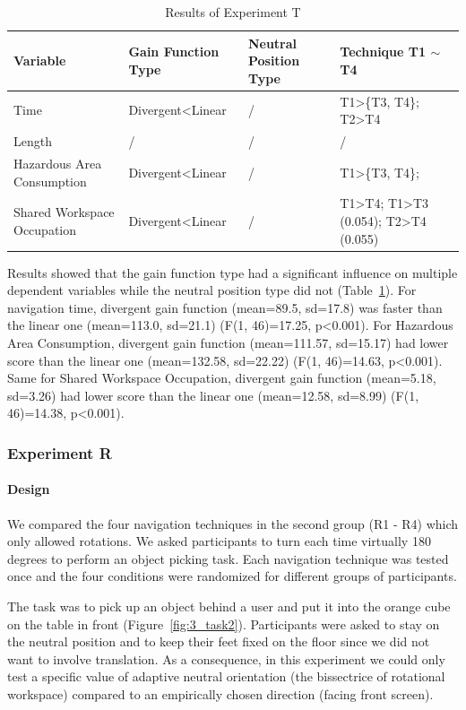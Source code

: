 \begin{table}[!t]
\renewcommand{\arraystretch}{1.3}
\caption{Results of Experiment T}
\label{tab:3_result_t1}
\centering
\begin{tabular}{l l l l}
  \hline
  Variable & Gain Function Type & Neutral Position Type & Technique T1 $\sim$ T4 \\
  \hline
  Time & Divergent\textless Linear & / & T1\textgreater \{T3, T4\}; T2\textgreater T4 \\
  Length & / & / & / \\
  Hazardous Area Consumption & Divergent\textless Linear & / & T1\textgreater \{T3, T4\}; \\
  Shared Workspace Occupation & Divergent\textless Linear & / & T1\textgreater T4; T1\textgreater T3 (0.054); T2\textgreater T4 (0.055) \\
  \hline
\end{tabular}
\end{table}

Results showed that the gain function type had a significant influence on multiple dependent variables while the neutral position type did not (Table~\ref{tab:3_result_t1}). For navigation time, divergent gain function (mean=89.5, sd=17.8) was faster than the linear one (mean=113.0, sd=21.1) (F(1, 46)=17.25, p\textless 0.001). For Hazardous Area Consumption, divergent gain function (mean=111.57, sd=15.17) had lower score than the linear one (mean=132.58, sd=22.22) (F(1, 46)=14.63, p\textless 0.001). Same for Shared Workspace Occupation, divergent gain function (mean=5.18, sd=3.26) had lower score than the linear one (mean=12.58, sd=8.99) (F(1, 46)=14.38, p\textless 0.001).


\subsubsection{Experiment R}
\paragraph{Design}
We compared the four navigation techniques in the second group (R1 - R4) which only allowed rotations. We asked participants to turn each time virtually 180 degrees to perform an object picking task. Each navigation technique was tested once and the four conditions were randomized for different groups of participants.

The task was to pick up an object behind a user and put it into the orange cube on the table in front (Figure~\ref{fig:3_task2}). Participants were asked to stay on the neutral position and to keep their feet fixed on the floor since we did not want to involve translation. As a consequence, in this experiment we could only test a specific value of adaptive neutral orientation (the bissectrice of rotational workspace) compared to an empirically chosen direction (facing front screen).

